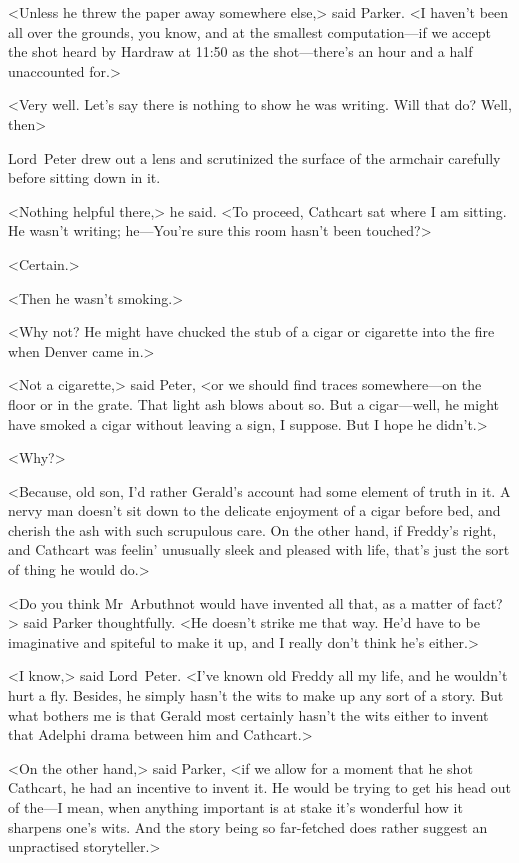 <Unless he threw the paper away somewhere else,> said Parker. <I haven't been all over the grounds, you know, and at the smallest computation—if we accept the shot heard by Hardraw at 11:50 as the shot—there's an hour and a half unaccounted for.>

<Very well. Let's say there is nothing to show he was writing. Will that do? Well, then\longdash>

Lord~Peter drew out a lens and scrutinized the surface of the armchair carefully before sitting down in it.

<Nothing helpful there,> he said. <To proceed, Cathcart sat where I am sitting. He wasn't writing; he—You're sure this room hasn't been touched?>

<Certain.>

<Then he wasn't smoking.>

<Why not? He might have chucked the stub of a cigar or cigarette into the fire when Denver came in.>

<Not a cigarette,> said Peter, <or we should find traces somewhere—on the floor or in the grate. That light ash blows about so. But a cigar—well, he might have smoked a cigar without leaving a sign, I suppose. But I hope he didn't.>

<Why?>

<Because, old son, I'd rather Gerald's account had some element of truth in it. A nervy man doesn't sit down to the delicate enjoyment of a cigar before bed, and cherish the ash with such scrupulous care. On the other hand, if Freddy's right, and Cathcart was feelin' unusually sleek and pleased with life, that's just the sort of thing he would do.>

<Do you think Mr~Arbuthnot would have invented all that, as a matter of fact?> said Parker thoughtfully. <He doesn't strike me that way. He'd have to be imaginative and spiteful to make it up, and I really don't think he's either.>

<I know,> said Lord~Peter. <I've known old Freddy all my life, and he wouldn't hurt a fly. Besides, he simply hasn't the wits to make up any sort of a story. But what bothers me is that Gerald most certainly hasn't the wits either to invent that Adelphi drama between him and Cathcart.>

<On the other hand,> said Parker, <if we allow for a moment that he shot Cathcart, he had an incentive to invent it. He would be trying to get his head out of the—I mean, when anything important is at stake it's wonderful how it sharpens one's wits. And the story being so far-fetched does rather suggest an unpractised storyteller.>

